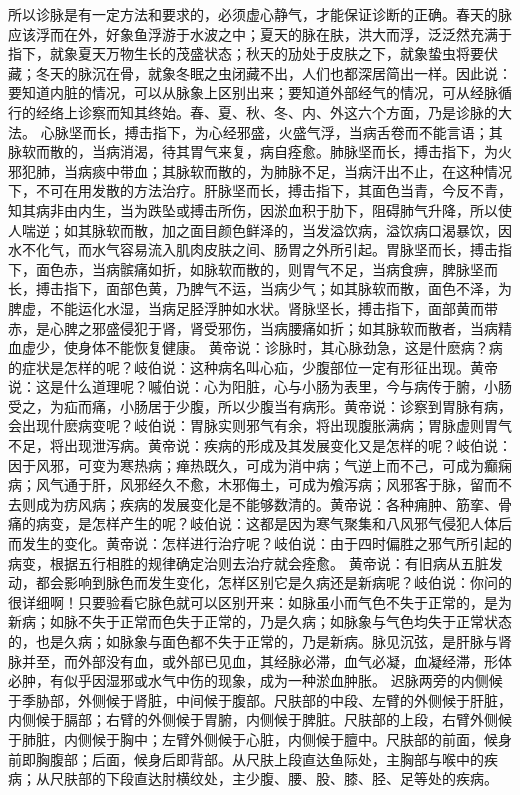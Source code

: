 \documentclass[a4paper,12pt,UTF8,twoside]{ctexbook}
\begin{document}
所以诊脉是有一定方法和要求的，必须虚心静气，才能保证诊断的正确。春天的脉应该浮而在外，好象鱼浮游于水波之中；夏天的脉在肤，洪大而浮，泛泛然充满于指下，就象夏天万物生长的茂盛状态；秋天的劢处于皮肤之下，就象蛰虫将要伏藏；冬天的脉沉在骨，就象冬眠之虫闭藏不出，人们也都深居简出一样。因此说：要知道内脏的情况，可以从脉象上区别出来；要知道外部经气的情况，可从经脉循行的经络上诊察而知其终始。春、夏、秋、冬、内、外这六个方面，乃是诊脉的大法。
心脉坚而长，搏击指下，为心经邪盛，火盛气浮，当病舌卷而不能言语；其脉软而散的，当病消渴，待其胃气来复，病自痊愈。肺脉坚而长，搏击指下，为火邪犯肺，当病痰中带血；其脉软而散的，为肺脉不足，当病汗出不止，在这种情况下，不可在用发散的方法治疗。肝脉坚而长，搏击指下，其面色当青，今反不青，知其病非由内生，当为跌坠或搏击所伤，因淤血积于肋下，阻碍肺气升降，所以使人喘逆；如其脉软而散，加之面目颜色鲜泽的，当发溢饮病，溢饮病口渴暴饮，因水不化气，而水气容易流入肌肉皮肤之间、肠胃之外所引起。胃脉坚而长，搏击指下，面色赤，当病髌痛如折，如脉软而散的，则胃气不足，当病食痹，脾脉坚而长，搏击指下，面部色黄，乃脾气不运，当病少气；如其脉软而散，面色不泽，为脾虚，不能运化水湿，当病足胫浮肿如水状。肾脉坚长，搏击指下，面部黄而带赤，是心脾之邪盛侵犯于肾，肾受邪伤，当病腰痛如折；如其脉软而散者，当病精血虚少，使身体不能恢复健康。
黄帝说：诊脉时，其心脉劲急，这是什麽病？病的症状是怎样的呢？岐伯说：这种病名叫心疝，少腹部位一定有形征出现。黄帝说：这是什么道理呢？嘁伯说：心为阳脏，心与小肠为表里，今与病传于腑，小肠受之，为疝而痛，小肠居于少腹，所以少腹当有病形。黄帝说：诊察到胃脉有病，会出现什麽病变呢？岐伯说：胃脉实则邪气有余，将出现腹胀满病；胃脉虚则胃气不足，将出现泄泻病。黄帝说：疾病的形成及其发展变化又是怎样的呢？岐伯说：因于风邪，可变为寒热病；瘅热既久，可成为消中病；气逆上而不己，可成为癫痫病；风气通于肝，风邪经久不愈，木邪侮土，可成为飧泻病；风邪客于脉，留而不去则成为疠风病；疾病的发展变化是不能够数清的。黄帝说：各种痈肿、筋挛、骨痛的病变，是怎样产生的呢？岐伯说：这都是因为寒气聚集和八风邪气侵犯人体后而发生的变化。黄帝说：怎样进行治疗呢？岐伯说：由于四时偏胜之邪气所引起的病变，根据五行相胜的规律确定治则去治疗就会痊愈。
黄帝说：有旧病从五脏发动，都会影响到脉色而发生变化，怎样区别它是久病还是新病呢？岐伯说：你问的很详细啊！只要验看它脉色就可以区别开来：如脉虽小而气色不失于正常的，是为新病；如脉不失于正常而色失于正常的，乃是久病；如脉象与气色均失于正常状态的，也是久病；如脉象与面色都不失于正常的，乃是新病。脉见沉弦，是肝脉与肾脉并至，而外部没有血，或外部已见血，其经脉必滞，血气必凝，血凝经滞，形体必肿，有似乎因湿邪或水气中伤的现象，成为一种淤血肿胀。
迟脉两旁的内侧候于季胁部，外侧候于肾脏，中间候于腹部。尺肤部的中段、左臂的外侧候于肝脏，内侧候于膈部；右臂的外侧候于胃腑，内侧候于脾脏。尺肤部的上段，右臂外侧候于肺脏，内侧候于胸中；左臂外侧候于心脏，内侧候于膻中。尺肤部的前面，候身前即胸腹部；后面，候身后即背部。从尺肤上段直达鱼际处，主胸部与喉中的疾病；从尺肤部的下段直达肘横纹处，主少腹、腰、股、膝、胫、足等处的疾病。
\end{document}
